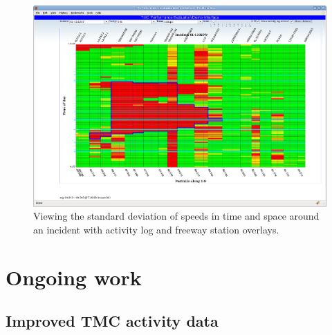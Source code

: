 \documentclass[12pt]{report}
\begin{document}
\begin{figure}[t]
  \centering
  \includegraphics[width=\textwidth]{images/i61-5-n-alog-sta.png}
  \caption{Viewing the standard deviation of speeds in time and space
    around an incident with activity log and freeway station
    overlays.}
  \label{fig:view-overlays}
\end{figure}




\section{Ongoing work}
\label{sec:ongoing-work}


\subsection{Improved TMC activity data}
\label{sec:improved-activity-data}
\end{document}
